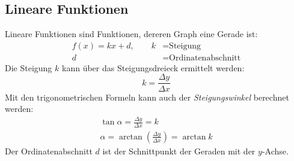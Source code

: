 \subsection{Lineare Funktionen}
Lineare Funktionen sind Funktionen, dereren Graph eine Gerade ist:
\begin{align}
    f(x) = k x + d, \qquad   k &= \text{Steigung} \\
                            d &= \text{Ordinatenabschnitt} \nonumber
\end{align}
Die Steigung $k$ kann über das Steigungsdreieck ermittelt werden:
\begin{equation}
    k = \frac{\Delta y}{\Delta x}
\end{equation}
Mit den trigonometrischen Formeln kann auch der \emph{Steigungswinkel} berechnet werden:
\begin{gather}
    \tan{\alpha} = \frac{\Delta y}{\Delta x} = k \\[5pt]
    \alpha = \arctan{\left( \frac{\Delta y}{\Delta x} \right)} = \arctan{k}
\end{gather}
Der Ordinatenabschnitt $d$ ist der Schnittpunkt der Geraden mit der $y$-Achse.

